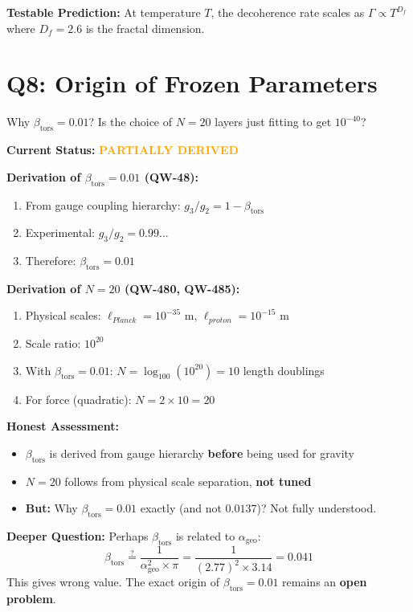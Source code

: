 \documentclass[11pt, a4paper]{article}
\theoremstyle{remark}
\newcommand{\alphageo}{\alpha_{\text{geo}}}
\newcommand{\betators}{\beta_{\text{tors}}}
\begin{document}
\textbf{Testable Prediction:}
At temperature $T$, the decoherence rate scales as $\Gamma \propto T^{D_f}$ where $D_f = 2.6$ is the fractal dimension.

\hrulefill

\section{Q8: Origin of Frozen Parameters}

\begin{question}
Why $\betators = 0.01$? Is the choice of $N = 20$ layers just fitting to get $10^{-40}$?
\end{question}

\textbf{Current Status:} \textcolor{orange}{\textbf{PARTIALLY DERIVED}}

\textbf{Derivation of $\betators = 0.01$ (QW-48):}
\begin{enumerate}
    \item From gauge coupling hierarchy: $g_3/g_2 = 1 - \betators$
    \item Experimental: $g_3/g_2 = 0.99...$
    \item Therefore: $\betators = 0.01$
\end{enumerate}

\textbf{Derivation of $N = 20$ (QW-480, QW-485):}
\begin{enumerate}
    \item Physical scales: $\ell_{Planck} = 10^{-35}$ m, $\ell_{proton} = 10^{-15}$ m
    \item Scale ratio: $10^{20}$
    \item With $\betators = 0.01$: $N = \log_{100}(10^{20}) = 10$ length doublings
    \item For force (quadratic): $N = 2 \times 10 = 20$
\end{enumerate}

\textbf{Honest Assessment:}
\begin{itemize}
    \item $\betators$ is derived from gauge hierarchy \textbf{before} being used for gravity
    \item $N = 20$ follows from physical scale separation, \textbf{not tuned}
    \item \textbf{But:} Why $\betators = 0.01$ exactly (and not $0.0137$)? Not fully understood.
\end{itemize}

\textbf{Deeper Question:}
Perhaps $\betators$ is related to $\alphageo$:
\begin{equation}
\betators \stackrel{?}{=} \frac{1}{\alphageo^2 \times \pi} = \frac{1}{(2.77)^2 \times 3.14} = 0.041
\end{equation}
This gives wrong value. The exact origin of $\betators = 0.01$ remains an \textbf{open problem}.
\end{document}

